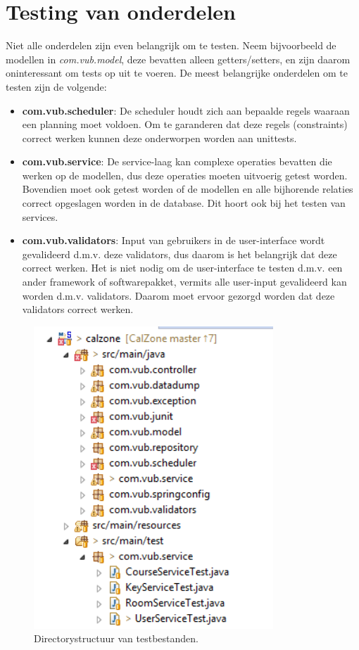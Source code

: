 \section{Testing van onderdelen}
Niet alle onderdelen zijn even belangrijk om te testen. Neem bijvoorbeeld de modellen in \emph{com.vub.model}, deze bevatten alleen getters/setters, en zijn daarom oninteressant om tests op uit te voeren. De meest belangrijke onderdelen om te testen zijn de volgende:
\begin{itemize}
	\item \textbf{com.vub.scheduler}: De scheduler houdt zich aan bepaalde regels waaraan een planning moet voldoen. 
	Om te garanderen dat deze regels (constraints) correct werken kunnen deze onderworpen worden aan unittests.
	\item \textbf{com.vub.service}: De service-laag kan complexe operaties bevatten die werken op de modellen, dus deze operaties moeten uitvoerig getest worden.
	Bovendien moet ook getest worden of de modellen en alle bijhorende relaties correct opgeslagen worden in de database. 
	Dit hoort ook bij het testen van services.
	\item \textbf{com.vub.validators}: Input van gebruikers in de user-interface wordt gevalideerd d.m.v. deze validators, dus daarom is het belangrijk dat deze correct werken.
	Het is niet nodig om de user-interface te testen d.m.v. een ander framework of softwarepakket, vermits alle user-input gevalideerd kan worden d.m.v. validators. 
	Daarom moet ervoor gezorgd worden dat deze validators correct werken.
\end{itemize}
	
\begin{figure}[ht!]
\centering
\includegraphics[width=90mm]{img/dir.png}
\caption{Directorystructuur van testbestanden.}
\label{dirstruct}
\end{figure}

